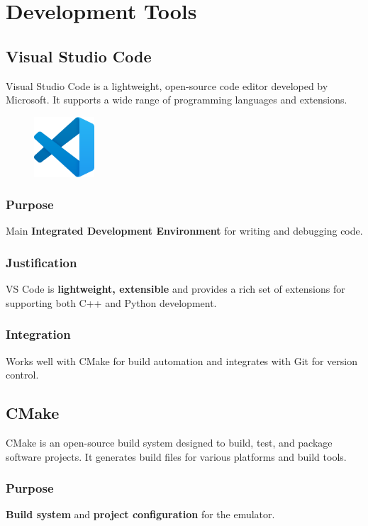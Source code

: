 \documentclass[a4paper, 11pt]{article}
\begin{document}
\section{Development Tools}

\subsection{Visual Studio Code}
Visual Studio Code is a lightweight, open-source code editor developed by Microsoft. It supports a wide range of programming languages and extensions.

\begin{figure}[h]
    \centering
    \includegraphics[width=0.2\textwidth]{vscode.png}
\end{figure}

\subsubsection{Purpose}
Main \textbf{Integrated Development Environment} for writing and debugging code.

\subsubsection{Justification}
VS Code is \textbf{lightweight, extensible} and provides a rich set of extensions for supporting both C++ and Python development.

\subsubsection{Integration}
Works well with CMake for build automation and integrates with Git for version control.

\subsection{CMake}
CMake is an open-source build system designed to build, test, and package software projects. It generates build files for various platforms and build tools.

\subsubsection{Purpose}
\textbf{Build system} and \textbf{project configuration} for the emulator.
\end{document}
